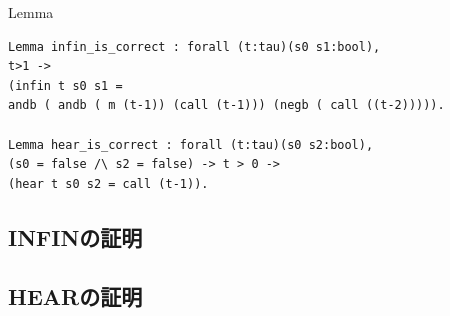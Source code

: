 \documentclass{jsbook}
\begin{document}
\begin{itembox}[l]{Lemma}
\begin{verbatim}
Lemma infin_is_correct : forall (t:tau)(s0 s1:bool), 
t>1 ->
(infin t s0 s1 = 
andb ( andb ( m (t-1)) (call (t-1))) (negb ( call ((t-2))))).

Lemma hear_is_correct : forall (t:tau)(s0 s2:bool),
(s0 = false /\ s2 = false) -> t > 0 ->
(hear t s0 s2 = call (t-1)).
\end{verbatim}
\end{itembox}

\subsection*{INFINの証明}
\subsection*{HEARの証明}
\end{document}
